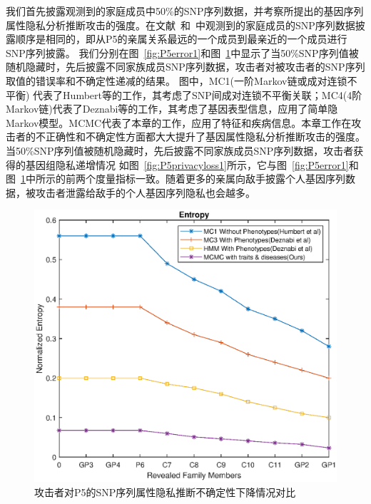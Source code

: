 我们首先披露观测到的家庭成员中50\%的SNP序列数据，并考察所提出的基因序列属性隐私分析推断攻击的强度。在文献~\cite{humbert2013addressing,humbert2017quantifying}和~\cite{deznabi2018inference}中观测到的家庭成员的SNP序列数据披露顺序是相同的，即从P5的亲属关系最远的一个成员到最亲近的一个成员进行SNP序列披露。 我们分别在图~\ref{fig:P5error1}和图~\ref{fig:P5entropy1}中显示了当50\%SNP序列值被随机隐藏时，先后披露不同家族成员SNP序列数据，攻击者对被攻击者的SNP序列取值的错误率和不确定性递减的结果。 图中，MC1(一阶Markov链或成对连锁不平衡) 代表了Humbert等的工作，其考虑了SNP间成对连锁不平衡关联；MC4(4阶Markov链)代表了Deznabi等的工作，其考虑了基因表型信息，应用了简单隐Markov模型。MCMC代表了本章的工作，应用了特征和疾病信息。本章工作在攻击者的不正确性和不确定性方面都大大提升了基因属性隐私分析推断攻击的强度。当50\%SNP序列值被随机隐藏时，先后披露不同家族成员SNP序列数据，攻击者获得的基因组隐私递增情况 如图~\ref{fig:P5privacyloss1}所示，它与图~\ref{fig:P5error1}和图~\ref{fig:P5entropy1}中所示的前两个度量指标一致。随着更多的亲属向敌手披露个人基因序列数据，被攻击者泄露给敌手的个人基因序列隐私也会越多。

\begin{figure}[htbp]
	\centering
	\includegraphics[width=0.8\linewidth]{./figures/P5entropy1.eps}
	\centering
	\caption{攻击者对P5的SNP序列属性隐私推断不确定性下降情况对比}\label{fig:P5entropy1}
\end{figure}

